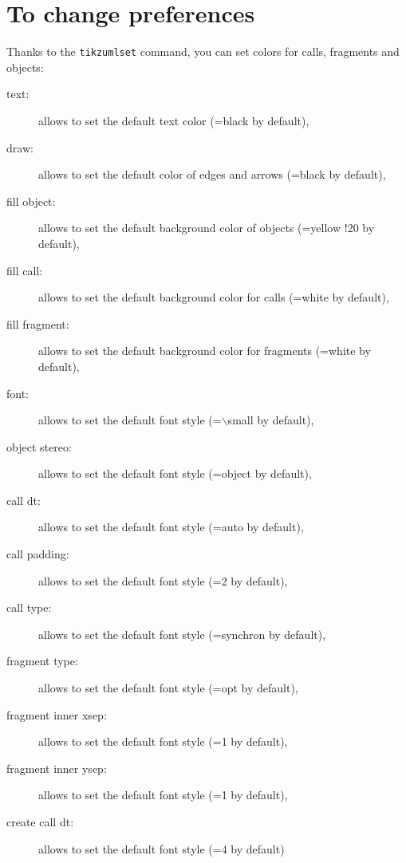 \documentclass[a4paper,11pt]{report}
\begin{document}
\medskip

\begin{minipage}{0.5\textwidth}

\end{minipage}
\begin{minipage}{0.5\textwidth}
\begin{center}
\end{center}
\end{minipage}

\section{To change preferences}\label{s.fitseq}

Thanks to the {\tt tikzumlset} command, you can set colors for calls, fragments and objects:

\begin{description}
\item[text:] allows to set the default text color (=black by default),
\item[draw:] allows to set the default color of edges and arrows (=black by default),
\item[fill object:] allows to set the default background color of objects (=yellow !20 by default),
\item[fill call:] allows to set the default background color for calls (=white by default),
\item[fill fragment:] allows to set the default background color for fragments (=white by default),
\item[font:] allows to set the default font style (=$\backslash$small by default),
\item[object stereo:] allows to set the default font style (=object by default),
\item[call dt:] allows to set the default font style (=auto by default),
\item[call padding:] allows to set the default font style (=2 by default),
\item[call type:] allows to set the default font style (=synchron by default),
\item[fragment type:] allows to set the default font style (=opt by default),
\item[fragment inner xsep:] allows to set the default font style (=1 by default),
\item[fragment inner ysep:] allows to set the default font style (=1 by default),
\item[create call dt:] allows to set the default font style (=4 by default)
\end{description}
\end{document}
